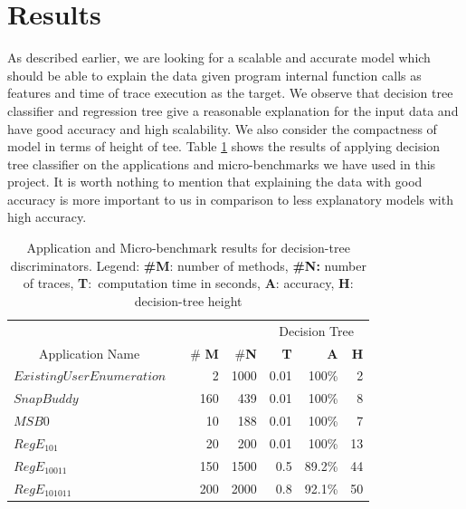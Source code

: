 \documentclass{article}
\begin{document}
\section{Results}
As described earlier, we are looking for a scalable and accurate model which should
be able to explain the data given program internal function calls as features and time
of trace execution as the target. We observe that decision tree classifier and
regression tree give a reasonable explanation for the input data and have good
accuracy and high scalability. We also consider the compactness of model in
terms of height of tee. Table \ref{table7-1} shows the results of applying decision
tree classifier on the applications and micro-benchmarks we have used in this project.
It is worth nothing to mention that explaining the data with good accuracy is more
important to us in comparison to less explanatory models with high accuracy.

\begin{table}[t]
  \centering
  \caption{Application and Micro-benchmark results for decision-tree discriminators. 
    Legend: \textbf{\#M}: number of methods, \textbf{\#N:} number of traces,
    \textbf{T}:\ computation time in seconds, \textbf{A}: accuracy, 
    \textbf{H}: decision-tree height %
   }
  \label{table7-1}
  \begin{tabular}{ || l | r | r || r | r | r ||}
    \hline
    &       &    & \multicolumn{3}{c||}{Decision Tree}\\
    ~~~~Application Name~~~~~~ & \# \textbf{M} & \#\textbf{N} & \textbf{T} & \textbf{A} & \textbf{H} \\ \hline
     $Existing User Enumeration$ & 2 & 1000 & 0.01 & 100\% & 2  \\ \hline
    $SnapBuddy$ & 160 & 439 & 0.01 & 100\% & 8  \\ \hline
    $MSB0$ & 10 & 188 & 0.01 & 100\% & 7  \\ \hline
    $RegE_{101}$ & 20 & 200 & 0.01 & 100\% & 13 \\ \hline
    $RegE_{10011}$ & 150 & 1500 & 0.5 & 89.2\% & 44  \\ \hline
    $RegE_{101011}$ & 200 & 2000 & 0.8 & 92.1\% & 50 \\ \hline
    \end{tabular}
\end{table}
\end{document}
